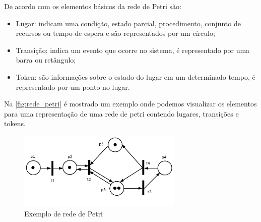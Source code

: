         \par
        De acordo com \citeauthor{cardoso1997redes} os elementos básicos da rede de Petri são:
        \begin{itemize}
            \item Lugar: indicam uma condição, estado parcial, procedimento, conjunto de recursos ou tempo de espera e são representados por um círculo;
            \item Transição: indica um evento que ocorre no sistema, é representado por uma barra ou retângulo;
            \item Token: são informações sobre o estado do lugar em um determinado tempo, é representado por um ponto no lugar.
        \end{itemize} Na \autoref{fig:rede_petri} é mostrado um exemplo onde podemos visualizar os elementos para uma representação de  uma rede de petri contendo lugares, transições e tokens.
        \begin{figure}[H]
              \caption{\label{fig:rede_petri}{Exemplo de rede de Petri}}
              \centering
              \includegraphics[width=0.7\textwidth]{Figuras/rede_petri.png}
        \end{figure}
        
